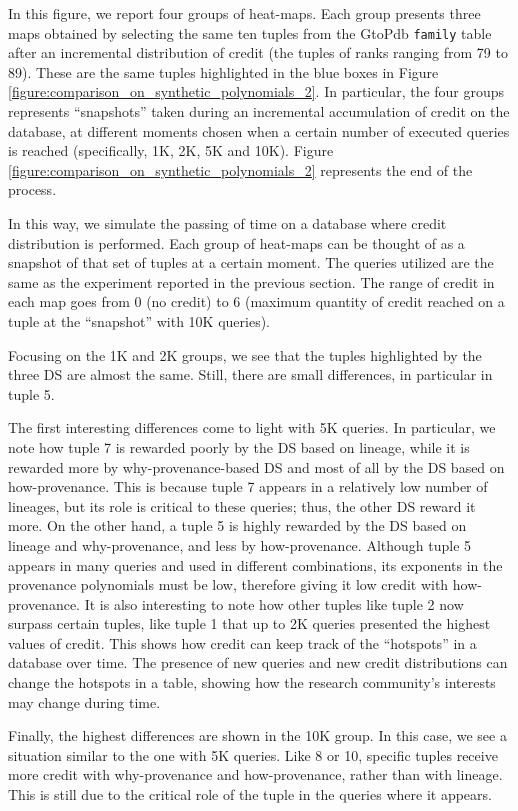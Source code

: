 In this figure, we report four groups of heat-maps. Each group presents three maps obtained by selecting the same ten tuples from the GtoPdb \texttt{family} table after an incremental distribution of credit (the tuples of ranks ranging from 79 to 89). These are the same tuples highlighted in the blue boxes in Figure \ref{figure:comparison_on_synthetic_polynomials_2}.  In particular, the four groups represents ``snapshots'' taken during an incremental accumulation of credit on the database, at different moments chosen when a certain number of executed queries is reached (specifically, 1K, 2K, 5K and 10K).
Figure \ref{figure:comparison_on_synthetic_polynomials_2} represents the end of the process. 

In this way, we simulate the passing of time on a database where credit distribution is performed. Each group of heat-maps can be thought of as a snapshot of that set of tuples at a certain moment. 
The queries utilized are the same as the experiment reported in the previous section. The range of credit in each map goes from 0 (no credit) to 6 (maximum quantity of credit reached on a tuple at the ``snapshot'' with 10K queries).

Focusing on the 1K and 2K groups, we see that the tuples highlighted by the three DS are almost the same. Still, there are small differences, in particular in tuple 5.

The first interesting differences come to light with 5K queries. In particular, we note how tuple 7 is rewarded poorly by the DS based on lineage, while it is rewarded more by why-provenance-based DS and most of all by the DS based on how-provenance. This is because tuple 7 appears in a relatively low number of lineages, but its role is critical to these queries; thus, the other DS reward it more.
On the other hand, a tuple 5 is highly rewarded by the DS based on lineage and why-provenance, and less by how-provenance. Although tuple 5 appears in many queries and used in different combinations, its exponents in the provenance polynomials must be low, therefore giving it low credit with how-provenance.
It is also interesting to note how other tuples like tuple 2 now surpass certain tuples, like tuple 1 that up to 2K queries presented the highest values of credit. This shows how credit can keep track of the ``hotspots'' in a database over time. The presence of new queries and new credit distributions can change the hotspots in a table, showing how the research community's interests may change during time. 

Finally, the highest differences are shown in the 10K group. In this case, we see a situation similar to the one with 5K queries. Like 8 or 10, specific tuples receive more credit with why-provenance and how-provenance, rather than with lineage. This is still due to the critical role of the tuple in the queries where it appears. 

